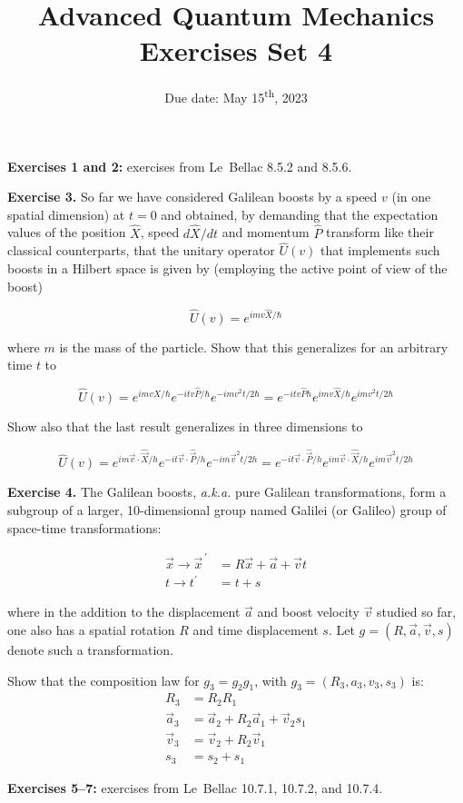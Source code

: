 \documentclass[12pt]{article}
\title{Advanced Quantum Mechanics\\Exercises Set 4\vspace{-0.5em}}
\date{Due date: May 15\textsuperscript{th}, 2023}
\begin{document}
\maketitle


\textbf{Exercises 1 and 2:} exercises from Le~Bellac 8.5.2 and 8.5.6.

\textbf{Exercise 3.}
 So far we have considered Galilean boosts by a speed \(v\) (in one spatial dimension)
at \(t=0\) and obtained, by demanding that the expectation values of the position \(\hat{X}\), speed
\(d \hat{X} / d t\) and momentum \(\hat{P}\) transform like their classical counterparts, that the unitary operator
\(\hat{U}(v)\) that implements such boosts in a Hilbert space is given by (employing the active point
of view of the boost)

\[\hat{U}(v)=e^{i m v \hat{X} / \hbar}\]

where \(m\) is the mass of the particle. Show that this generalizes for an arbitrary time \(t\) to

\[\hat{U}(v)=e^{i m v \hat{X} / \hbar} e^{-i t v \hat{P} / \hbar} e^{-i m v^{2} t / 2 \hbar}=e^{-i t v \hat{P} h} e^{i m v \hat{X} / \hbar} e^{i m v^{2} t / 2 \hbar}\]

Show also that the last result generalizes in three dimensions to

\[\hat{U}(v)=e^{i m \vec{v} \cdot \hat{\vec{X}} / h} e^{-i t \vec{v} \cdot \hat{\vec{P}} / h} e^{-i m \vec{v}^{2} t / 2 h}=e^{-i t \vec{v} \cdot \hat{\vec{P}} / h} e^{i m \vec{v} \cdot \hat{\vec{X}} / h} e^{i m \vec{v}^{2} t / 2 h}\]

\textbf{Exercise 4.} The Galilean boosts, \textit{a.k.a.} pure Galilean transformations, form a subgroup of a
larger, 10-dimensional group named Galilei (or Galileo) group of space-time transformations:

\[
\begin{aligned}
\vec{x} \rightarrow \vec{x}^{\,\prime}&=R \vec{x}+\vec{a}+\vec{v} t \\ 
t \rightarrow t^{\prime}&=t+s
\end{aligned}
\]

where in the addition to the displacement \(\vec{a}\) and boost velocity \(\vec{v}\) studied so far, one also has
a spatial rotation \(R\) and time displacement \(s\). Let \(g=(R, \vec{a}, \vec{v}, s)\) denote such a transformation.

Show that the composition law for \(g_{3}=g_{2} g_{1}\), with \(g_{3}=\left(R_{3}, a_{3}, v_{3}, s_{3}\right)\) is:
\[
\begin{aligned} 
R_{3} &=R_{2} R_{1} \\ 
\vec{a}_{3} &=\vec{a}_{2}+R_{2} \vec{a}_{1}+\vec{v}_{2} s_{1} \\ 
\vec{v}_{3} &=\vec{v}_{2}+R_{2} \vec{v}_{1} \\ 
s_{3} &=s_{2}+s_{1} 
\end{aligned}
\]

\textbf{Exercises 5--7:} exercises from Le~Bellac 10.7.1, 10.7.2, and 10.7.4.
\end{document}
